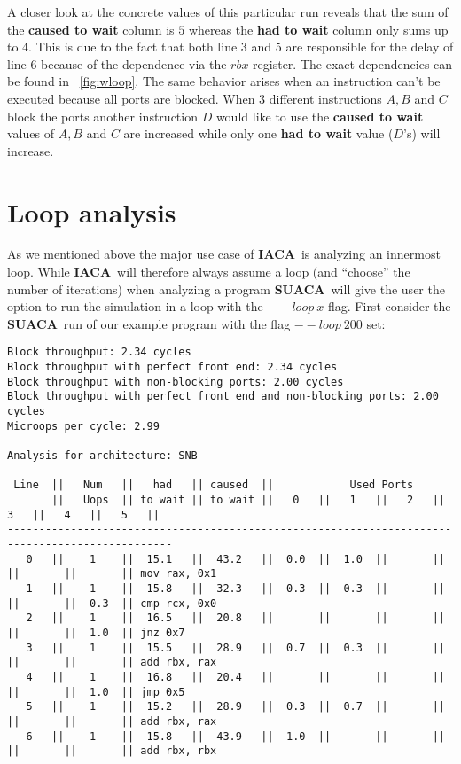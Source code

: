 \documentclass[a4paper,12pt,titlepage, twoside]{report}
\newcommand{\suaca}{\textbf{SUACA}}
\newcommand{\iaca}{\textbf{IACA}}
\begin{document}
A closer look at the concrete values of this particular run reveals that the sum of the \textbf{caused to wait} column is $5$ whereas the \textbf{had to wait} column only sums up to $4$. This is due to the fact that both line $3$ and $5$ are responsible for the delay of line $6$ because of the dependence via the $rbx$ register. The exact dependencies can be found in ~\autoref{fig:wloop}. The same behavior arises when an instruction can't be executed because all ports are blocked. When $3$ different instructions $A, B$ and $C$ block the ports another instruction $D$ would like to use the \textbf{caused to wait} values of $A, B$ and $C$ are increased while only one \textbf{had to wait} value ($D$'s) will increase.




\section{Loop analysis}
\label{sec:loop}
As we mentioned above the major use case of \iaca\ is analyzing an innermost loop. While \iaca\ will therefore always assume a loop (and ``choose'' the number of iterations) when analyzing a program \suaca\ will give the user the option to run the simulation in a loop with the $--loop\ x$ flag. First consider the \suaca\ run of our example program with the flag $--loop\ 200$ set:

\begin{Verbatim}[fontsize=\scriptsize]
Block throughput: 2.34 cycles
Block throughput with perfect front end: 2.34 cycles
Block throughput with non-blocking ports: 2.00 cycles
Block throughput with perfect front end and non-blocking ports: 2.00 cycles
Microops per cycle: 2.99

Analysis for architecture: SNB

 Line  ||   Num   ||   had   || caused  ||            Used Ports
       ||   Uops  || to wait || to wait ||   0   ||   1   ||   2   ||   3   ||   4   ||   5   ||
------------------------------------------------------------------------------------------------
   0   ||    1    ||  15.1   ||  43.2   ||  0.0  ||  1.0  ||       ||       ||       ||       || mov rax, 0x1
   1   ||    1    ||  15.8   ||  32.3   ||  0.3  ||  0.3  ||       ||       ||       ||  0.3  || cmp rcx, 0x0
   2   ||    1    ||  16.5   ||  20.8   ||       ||       ||       ||       ||       ||  1.0  || jnz 0x7
   3   ||    1    ||  15.5   ||  28.9   ||  0.7  ||  0.3  ||       ||       ||       ||       || add rbx, rax
   4   ||    1    ||  16.8   ||  20.4   ||       ||       ||       ||       ||       ||  1.0  || jmp 0x5
   5   ||    1    ||  15.2   ||  28.9   ||  0.3  ||  0.7  ||       ||       ||       ||       || add rbx, rax
   6   ||    1    ||  15.8   ||  43.9   ||  1.0  ||       ||       ||       ||       ||       || add rbx, rbx
\end{Verbatim}
\end{document}
